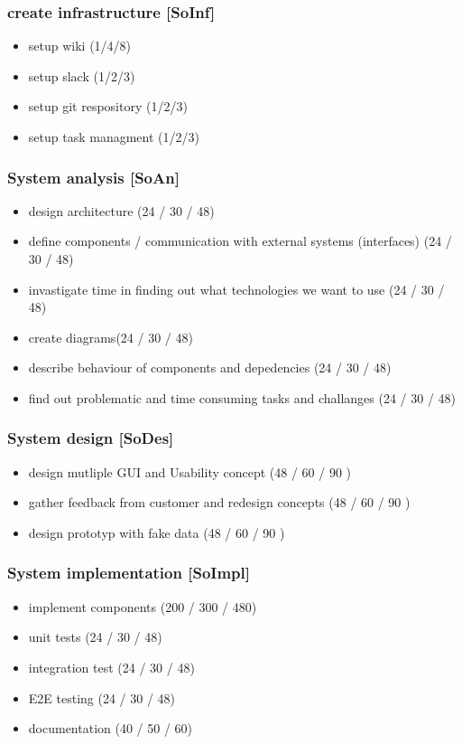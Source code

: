 \subsubsection*{create infrastructure [SoInf]}
\label{sec:org06c00a2}
\begin{itemize}
\item setup wiki (1/4/8)
\item setup slack (1/2/3)
\item setup git respository (1/2/3)
\item setup task managment (1/2/3)
\end{itemize}
\subsubsection*{System analysis [SoAn]}
\label{sec:org498acda}
\begin{itemize}
\item design architecture (24 / 30 / 48)
\item define components / communication with external systems (interfaces) (24 / 30 / 48)
\item invastigate time in finding out what technologies we want to use (24 / 30 / 48)
\item create diagrams(24 / 30 / 48)
\item describe behaviour of components and depedencies (24 / 30 / 48)
\item find out problematic and time consuming tasks and challanges (24 / 30 / 48)
\end{itemize}
\subsubsection*{System design [SoDes]}
\label{sec:org1137d7c}
\begin{itemize}
\item design mutliple GUI and Usability concept (48 / 60 / 90 )
\item gather feedback from customer and redesign concepts (48 / 60 / 90 )
\item design prototyp with fake data (48 / 60 / 90 )
\end{itemize}
\subsubsection*{System implementation [SoImpl]}
\label{sec:orgf2f809f}
\begin{itemize}
\item implement components (200 / 300 / 480)
\item unit tests (24 / 30 / 48)
\item integration test (24 / 30 / 48)
\item E2E testing (24 / 30 / 48)
\item documentation (40 / 50 / 60)
\end{itemize}


